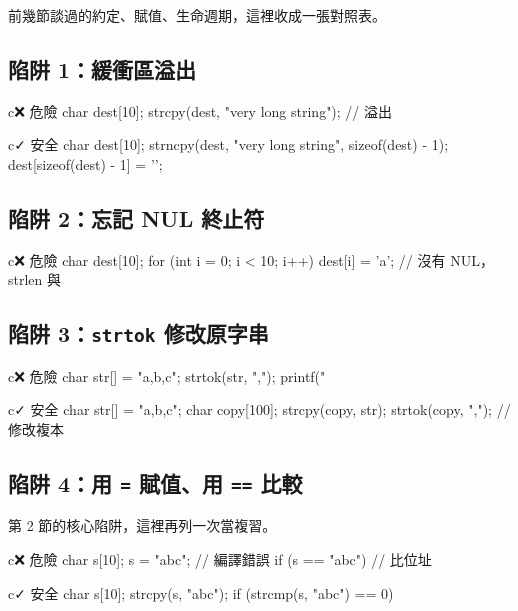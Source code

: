 前幾節談過的約定、賦值、生命週期，這裡收成一張對照表。

\subsection{陷阱 1：緩衝區溢出}

\begin{code}{c}{❌ 危險}
char dest[10];
strcpy(dest, "very long string");  // 溢出
\end{code}

\begin{code}{c}{✓ 安全}
char dest[10];
strncpy(dest, "very long string", sizeof(dest) - 1);
dest[sizeof(dest) - 1] = '\0';
\end{code}

\subsection{陷阱 2：忘記 NUL 終止符}

\begin{code}{c}{❌ 危險}
char dest[10];
for (int i = 0; i < 10; i++) {
    dest[i] = 'a';
}
// 沒有 NUL，strlen 與 %
\end{code}

\subsection{陷阱 3：\texttt{strtok} 修改原字串}

\begin{code}{c}{❌ 危險}
char str[] = "a,b,c";
strtok(str, ",");
printf("%
\end{code}

\begin{code}{c}{✓ 安全}
char str[] = "a,b,c";
char copy[100];
strcpy(copy, str);
strtok(copy, ",");     // 修改複本
\end{code}

\subsection{陷阱 4：用 \texttt{=} 賦值、用 \texttt{==} 比較}

第 2 節的核心陷阱，這裡再列一次當複習。

\begin{code}{c}{❌ 危險}
char s[10];
s = "abc";            // 編譯錯誤
if (s == "abc") {     // 比位址
}
\end{code}

\begin{code}{c}{✓ 安全}
char s[10];
strcpy(s, "abc");
if (strcmp(s, "abc") == 0) {
}
\end{code}


